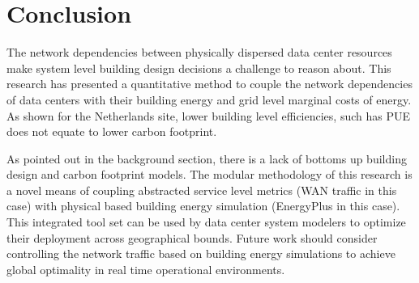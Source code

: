 \section{Conclusion}
The network dependencies between physically dispersed data center resources make system level building design decisions a challenge to reason about. This research has presented a quantitative method to couple the network dependencies of data centers with their building energy and grid level marginal costs of energy. As shown for the Netherlands site, lower building level efficiencies, such has PUE does not equate to lower carbon footprint.  

As pointed out in the background section, there is a lack of bottoms up building design and carbon footprint models. The modular methodology of this research is a novel means of coupling abstracted service level metrics (WAN traffic in this case) with physical based building energy simulation (EnergyPlus in this case). This integrated tool set can be used by data center system modelers to optimize their deployment across geographical bounds. Future work should consider controlling the network traffic based on building energy simulations to achieve global optimality in real time operational environments.  


